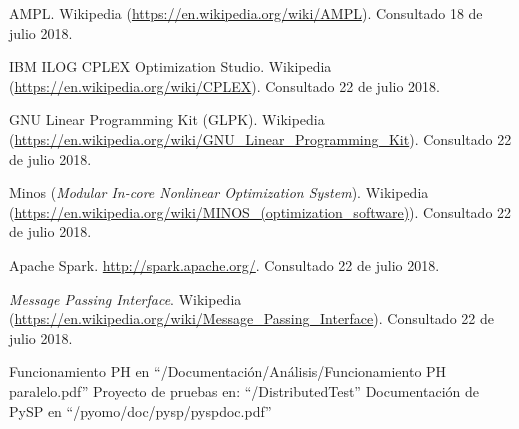\begin{thebibliography}{99}
 AMPL. Wikipedia (\url{https://en.wikipedia.org/wiki/AMPL}). Consultado 18 de julio 2018.

 IBM ILOG CPLEX Optimization Studio. Wikipedia (\url{https://en.wikipedia.org/wiki/CPLEX}). Consultado 22 de julio 2018.

 GNU Linear Programming Kit (GLPK). Wikipedia (\url{https://en.wikipedia.org/wiki/GNU_Linear_Programming_Kit}). Consultado 22 de julio 2018.

 Minos (\textit{Modular In-core Nonlinear Optimization System}). Wikipedia (\url{https://en.wikipedia.org/wiki/MINOS\_(optimization\_software)}). Consultado 22 de julio 2018.

 Apache Spark. \url{http://spark.apache.org/}. Consultado 22 de julio 2018.

 \textit{Message Passing Interface}. Wikipedia (\url{https://en.wikipedia.org/wiki/Message_Passing_Interface}). Consultado 22 de julio 2018.


 Funcionamiento PH en ``/Documentación/Análisis/Funcionamiento PH paralelo.pdf''
 Proyecto de pruebas en: ``/DistributedTest''
 Documentación de PySP en ``/pyomo/doc/pysp/pyspdoc.pdf''

\end{thebibliography}

